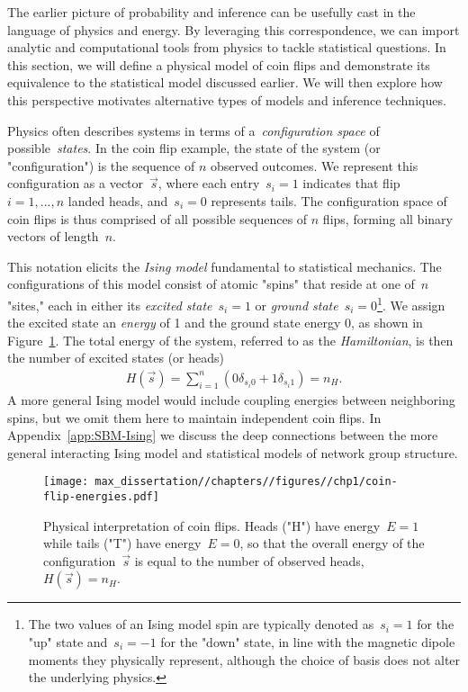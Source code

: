 The earlier picture of probability and inference can be usefully cast in the language of physics and energy. By leveraging this correspondence, we can import analytic and computational tools from physics to tackle statistical questions. In this section, we will define a physical model of coin flips and demonstrate its equivalence to the statistical model discussed earlier. We will then explore how this perspective motivates alternative types of models and inference techniques. 

Physics often describes systems in terms of a~\emph{configuration space} of possible~\emph{states}.  In the coin flip example, the state of the system (or "configuration") is the sequence of $n$ observed outcomes. We represent this configuration as a vector~$\vec{s}$, where each entry~$s_i = 1$ indicates that flip~$i = 1,...,n$ landed heads, and~$s_i = 0$ represents tails. The configuration space of coin flips is thus comprised of all possible sequences of $n$ flips, forming all binary vectors of length~$n$. 

This notation elicits the \emph{Ising model} fundamental to statistical mechanics. The configurations of this model consist of atomic "spins" that reside at one of~$n$ "sites," each in either its \emph{excited state}~$s_i = 1$ or \emph{ground state}~$s_i = 0$\footnote{The two values of an Ising model spin are typically denoted as~$s_i = 1$ for the "up" state and~$s_i = -1$ for the "down" state, in line with the magnetic dipole moments they physically represent, although the choice of basis does not alter the underlying physics.}. We assign the excited state an \emph{energy} of 1 and the ground state energy 0, as shown in Figure~\ref{fig:coin-flip-energies}. The total energy of the system, referred to as the \emph{Hamiltonian}, is then the number of excited states (or heads) \begin{align}
    H(\vec{s}) = \sum_{i=1}^n \left(0 \delta_{s_i 0} + 1 \delta_{s_i 1}\right) = n_H. \label{eq:coin-flip-energy}
\end{align} 
A more general Ising model would include coupling energies between neighboring spins, but we omit them here to maintain independent coin flips. In Appendix~\ref{app:SBM-Ising} we discuss the deep connections between the more general interacting Ising model and statistical models of network group structure.

\begin{figure}
    \centering
    \texttt{[image: max\_dissertation//chapters//figures//chp1/coin-flip-energies.pdf]}
    \caption{Physical interpretation of coin flips. Heads ("H") have energy~$E = 1$ while tails ("T") have energy~$E = 0$, so that the overall energy of the configuration~$\vec{s}$ is equal to the number of observed heads,~$H(\vec{s}) = n_H$.}
    \label{fig:coin-flip-energies}
\end{figure}

